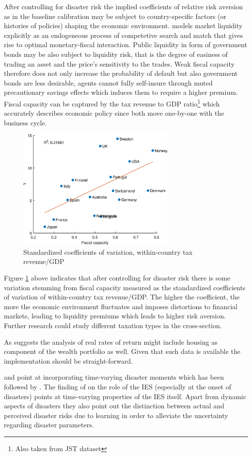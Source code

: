 After controlling for disaster risk the implied coefficients of relative risk aversion as in the baseline calibration may be subject to country-specific factors (or histories of policies) shaping the economic environment. \citet{Cui2016} models market liquidity explicitly as an endogeneous process of competetive search and match that gives rise to optimal monetary-fiscal interaction. Public liquidity in form of government bonds may be also subject to liquidity risk, that is the degree of easiness of trading an asset and the price's sensitivity to the trades. Weak fiscal capacity therefore does not only increase the probability of default but also government bonds are less desirable, agents cannot fully self-insure through muted precautionary savings effects which induces them to require a higher premium. Fiscal capacity can be captured by the tax revenue to GDP ratio\footnote{Also taken from JST dataset} which accurately describes economic policy since both move one-by-one with the business cycle. 

\begin{figure}[H]
	\centering
  \includegraphics[width=0.7\textwidth]{Matlab Graphics/Fiscal_capacity}
	\caption{Standardized coefficients of variation, within-country tax revenue/GDP}
	\label{fig:fiscal_capacity}
\end{figure}
Figure \ref{fig:fiscal_capacity} above indicates that after controlling for disaster risk there is some variation stemming from fiscal capacity measured as the standardized coefficients of variation of within-country tax revenue/GDP. The higher the coefficient, the more the economic environment fluctuates and imposes distortions to financial markets, leading to liquidity premiums which leads to higher risk aversion. Further research could study different taxation types in the cross-section.

As \citet{Barro2006} suggests the analysis of real rates of return might include housing as component of the wealth portfolio as well. Given that such data is available \cite{Jorda2017} the implementation should be straight-forward.

\citet{Barro2006} and \citet{Nakamura2013} point at incorporating time-varying disaster moments which has been followed by \citet{Tsai2015}. The finding of \citet{Nakamura2013} on the role of the IES (especially at the onset of disasters) points at time-varying properties of the IES itself. Apart from dynamic aspects of disasters they also point out the distinction between actual and perceived disaster risks due to learning in order to alleviate the uncertainty regarding disaster parameters.